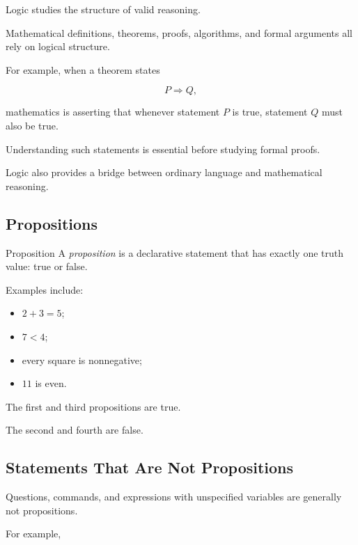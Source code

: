 Logic studies the structure of valid reasoning.

Mathematical definitions, theorems, proofs, algorithms, and formal arguments
all rely on logical structure.

For example, when a theorem states

\[ P\Longrightarrow Q, \]

mathematics is asserting that whenever statement \(P\) is true, statement
\(Q\) must also be true.

Understanding such statements is essential before studying formal proofs.

Logic also provides a bridge between ordinary language and mathematical
reasoning.

\subsection{Propositions}
\label{subsec:propositions}

\begin{definitionbox}{Proposition}
A \emph{proposition} is a declarative statement that has exactly one truth
value: true or false.
\end{definitionbox}

Examples include:

\begin{itemize}
    \item \(2+3=5\);
    \item \(7<4\);
    \item every square is nonnegative;
    \item \(11\) is even.
\end{itemize}

The first and third propositions are true.

The second and fourth are false.

\subsection{Statements That Are Not Propositions}
\label{subsec:nonpropositions}

Questions, commands, and expressions with unspecified variables are generally
not propositions.

For example,

